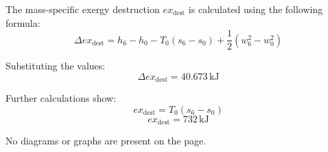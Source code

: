 The mass-specific exergy destruction \( ex_{\text{dest}} \) is calculated using the following formula:  
\[
\Delta ex_{\text{dest}} = h_{6} - h_{0} - T_{0}(s_{6} - s_{0}) + \frac{1}{2}(w_{6}^2 - w_{0}^2)
\]  

Substituting the values:  
\[
\Delta ex_{\text{dest}} = 40.673 \, \text{kJ}  
\]  

Further calculations show:  
\[
ex_{\text{dest}} = T_{0}(s_{6} - s_{0})  
\]  
\[
ex_{\text{dest}} = 732 \, \text{kJ}  
\]  

No diagrams or graphs are present on the page.
